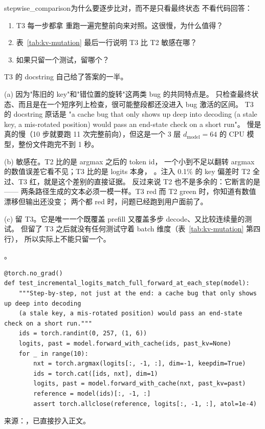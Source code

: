\begin{checkpoint}{stepwise_comparison}{为什么要逐步比对，而不是只看最终状态}
不看代码回答：
\begin{enumerate}[label=(\alph*)]
  \item T3 每一步都拿  重跑一遍完整前向来对照。这很慢，为什么值得？
  \item 表~\ref{tab:kv-mutation} 最后一行说明 T3 比 T2 敏感在哪？
  \item 如果只留一个测试，留哪个？
\end{enumerate}
\hint T3 的 docstring 自己给了答案的一半。

\ifshowanswers
\tcblower
\answer (a) 因为"陈旧的 key"和"错位置的旋转"这两类 bug 的共同特点是。
只检查最终状态、而且是在一个短序列上检查，很可能整段都还没进入 bug 激活的区间。
T3 的 docstring 原话是 "a cache bug that only shows up deep into decoding
(a stale key, a mis-rotated position) would pass an end-state check on a short run"。
慢是真的慢（10 步就要跑 11 次完整前向），但这是一个 3 层 $d_{\text{model}}{=}64$ 的
CPU 模型，整份文件跑完不到 1 秒。

(b) 敏感在。T2 比的是 argmax 之后的 token id，
一个小到不足以翻转 argmax 的数值误差它看不见；T3 比的是 logits 本身，
。注入 0.1\% 的 key 偏差时 T2 全过、T3 红，就是这个差别的直接证据。
反过来说 T2 也不是多余的：它断言的是——
两条路径生成的文本必须一模一样。T3 red 而 T2 green 时，你知道有数值漂移但输出还没变；
两个都 red 时，问题已经跑到用户面前了。

(c) 留 T3。它是唯一一个既覆盖 prefill 又覆盖多步 decode、又比较连续量的测试。
但留了 T3 之后就没有任何测试守着 batch 维度（表~\ref{tab:kv-mutation} 第四行），
所以实际上不能只留一个。

\whereincode {}。
\fi
\end{checkpoint}

\begin{lstlisting}[style=hlnum, firstnumber=66]
@torch.no_grad()
def test_incremental_logits_match_full_forward_at_each_step(model):
    """Step-by-step, not just at the end: a cache bug that only shows up deep into decoding
    (a stale key, a mis-rotated position) would pass an end-state check on a short run."""
    ids = torch.randint(0, 257, (1, 6))
    logits, past = model.forward_with_cache(ids, past_kv=None)
    for _ in range(10):
        nxt = torch.argmax(logits[:, -1, :], dim=-1, keepdim=True)
        ids = torch.cat([ids, nxt], dim=1)
        logits, past = model.forward_with_cache(nxt, past_kv=past)
        reference = model(ids)[:, -1, :]
        assert torch.allclose(reference, logits[:, -1, :], atol=1e-4)
\end{lstlisting}
\noindent 来源：，已直接抄入正文。

